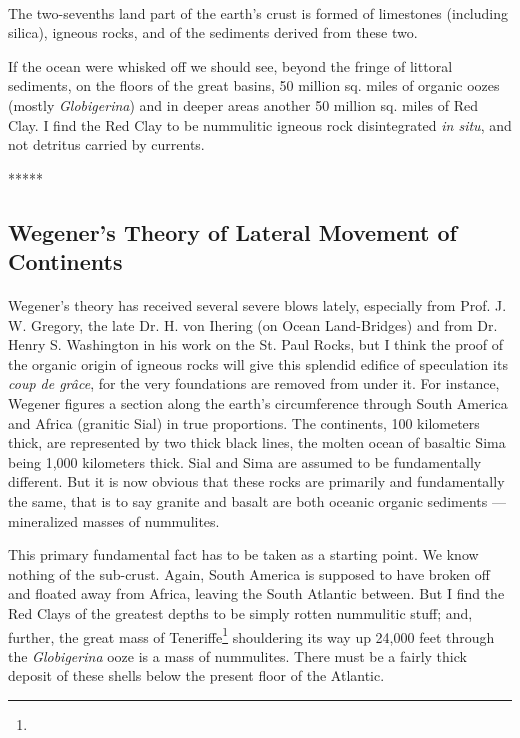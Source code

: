 \documentclass[a4paper, 12pt, oneside]{article}
\begin{document}
\paragraph{}
The two-sevenths land part of the earth's crust is formed of limestones (including silica), igneous rocks, and of the sediments derived from these two.

If the ocean were whisked off we should see, beyond the fringe of littoral sediments, on the floors of the great basins, 50 million sq. miles of organic oozes (mostly \emph{Globigerina}) and in deeper areas another 50 million sq. miles of Red Clay. I find the Red Clay to be nummulitic igneous rock disintegrated \emph{in situ}, and not detritus carried by currents.

\centerline{*\hspace{15mm}*\hspace{15mm}*\hspace{15mm}*\hspace{15mm}*}
\bigskip

\subsection{Wegener's Theory of Lateral Movement of Continents}
\paragraph{}
Wegener's theory has received several severe blows lately, especially from Prof. J. W. Gregory, the late Dr. H. von Ihering (on Ocean Land-Bridges) and from Dr. Henry S. Washington in his work on the St. Paul Rocks, but I think the proof of the organic origin of igneous rocks will give this splendid edifice of speculation its \emph{coup de grâce}, for the very foundations are removed from under it. For instance, Wegener figures a section along the earth's circumference through South America and Africa (granitic Sial) in true proportions. The continents, 100 kilometers thick, are represented by two thick black lines, the molten ocean of basaltic Sima being 1,000 kilometers thick. Sial and Sima are assumed to be fundamentally different. But it is now obvious that these rocks are primarily and fundamentally the same, that is to say granite and basalt are both oceanic organic sediments --- mineralized masses of nummulites.

This primary fundamental fact has to be taken as a starting point. We know nothing of the sub-crust. Again, South America is supposed to have broken off and floated away from Africa, leaving the South Atlantic between. But I find the Red Clays of the greatest depths to be simply rotten nummulitic stuff; and, further, the great mass of Teneriffe\footnote{} shouldering its way up 24,000 feet through the \emph{Globigerina} ooze is a mass of nummulites. There must be a fairly thick deposit of these shells below the present floor of the Atlantic.
\end{document}
